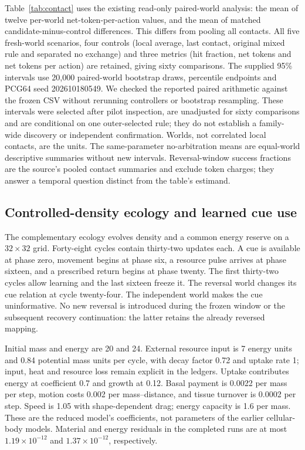 Table~\ref{tab:contact} uses the existing read-only paired-world analysis: the mean of twelve per-world net-token-per-action values, and the mean of matched candidate-minus-control differences. This differs from pooling all contacts. All five fresh-world scenarios, four controls (local average, last contact, original mixed rule and separated no exchange) and three metrics (hit fraction, net tokens and net tokens per action) are retained, giving sixty comparisons. The supplied 95\% intervals use 20,000 paired-world bootstrap draws, percentile endpoints and PCG64 seed 202610180549. We checked the reported paired arithmetic against the frozen CSV without rerunning controllers or bootstrap resampling. These intervals were selected after pilot inspection, are unadjusted for sixty comparisons and are conditional on one outer-selected rule; they do not establish a family-wide discovery or independent confirmation. Worlds, not correlated local contacts, are the units\cite{agarwal2021}. The same-parameter no-arbitration means are equal-world descriptive summaries without new intervals. Reversal-window success fractions are the source's pooled contact summaries and exclude token charges; they answer a temporal question distinct from the table's estimand.

\subsection*{Controlled-density ecology and learned cue use}
The complementary ecology evolves density and a common energy reserve on a $32\times32$ grid. Forty-eight cycles contain thirty-two updates each. A cue is available at phase zero, movement begins at phase six, a resource pulse arrives at phase sixteen, and a prescribed return begins at phase twenty. The first thirty-two cycles allow learning and the last sixteen freeze it. The reversal world changes its cue relation at cycle twenty-four. The independent world makes the cue uninformative. No new reversal is introduced during the frozen window or the subsequent recovery continuation: the latter retains the already reversed mapping.

Initial mass and energy are 20 and 24. External resource input is 7 energy units and 0.84 potential mass units per cycle, with decay factor 0.72 and uptake rate 1; input, heat and resource loss remain explicit in the ledgers. Uptake contributes energy at coefficient 0.7 and growth at 0.12. Basal payment is 0.0022 per mass per step, motion costs 0.002 per mass--distance, and tissue turnover is 0.0002 per step. Speed is 1.05 with shape-dependent drag; energy capacity is 1.6 per mass. These are the reduced model's coefficients, not parameters of the earlier cellular-body models. Material and energy residuals in the completed runs are at most $1.19\times10^{-12}$ and $1.37\times10^{-12}$, respectively.

